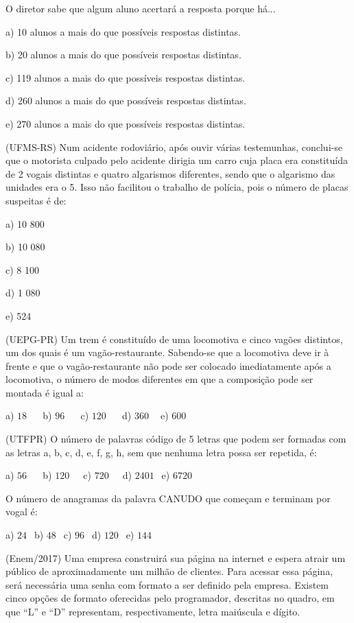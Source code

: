 \begin{multicols*}{2}
		      O diretor sabe que algum aluno acertará a resposta porque há...

		      a) 10 alunos a mais do que possíveis respostas distintas.

		      b) 20 alunos a mais do que possíveis respostas distintas.

		      c) 119 alunos a mais do que possíveis respostas distintas.

		      d) 260 alunos a mais do que possíveis respostas distintas.

		      e) 270 alunos a mais do que possíveis respostas distintas.

		\execnum (UFMS-RS) Num acidente rodoviário, após ouvir várias testemunhas, conclui-se que o motorista culpado pelo acidente dirigia um carro cuja placa era constituída de 2 vogais distintas e quatro algarismos diferentes, sendo que o algarismo das unidades era o 5. Isso não facilitou o trabalho de polícia, pois o número de placas suspeitas é de:

		      a) 10 800

		      b) 10 080

		      c) 8 100

		      d) 1 080

		      e) 524

		\execnum (UEPG-PR) Um trem é constituído de uma locomotiva e cinco vagões distintos, um dos quais é um vagão-restaurante. Sabendo-se que a locomotiva deve ir à frente e que o vagão-restaurante não pode ser colocado imediatamente após a locomotiva, o número de modos diferentes em que a composição pode ser montada é igual a:

		      a) $18 \ \ \ \ \ \ $ b) $96 \ \ \ \ \ \ $ c) $120 \ \ \ \ \ \ $ d) $360 \ \ \ \ $ e) $600 \ \ $

		\execnum (UTFPR) O número de palavras código de 5 letras que podem ser formadas com as letras a, b, c, d, e, f, g, h, sem que nenhuma letra possa ser repetida, é:

		      a) $56 \ \ \ \ \ \ $ b) $120 \ \ \ \ \ $ c) $720 \ \ \ \ \ $ d) $2401 \ \ $ e) $6720 $

		\execnum O número de anagramas da palavra CANUDO que começam e terminam por vogal é:

		      a) $24 \ \ $ b) $48 \ \ $ c) $96 \ \ $ d) $120 \ \ $ e) $144 \ \ $

		\execnum (Enem/2017) Uma empresa construirá sua página na internet e espera atrair um público de aproximadamente um milhão de clientes. Para acessar essa página, será necessária uma senha com formato a ser definido pela empresa. Existem cinco opções de formato oferecidas pelo programador, descritas no quadro, em que “L” e “D” representam, respectivamente, letra maiúscula e dígito.


\end{multicols*}

